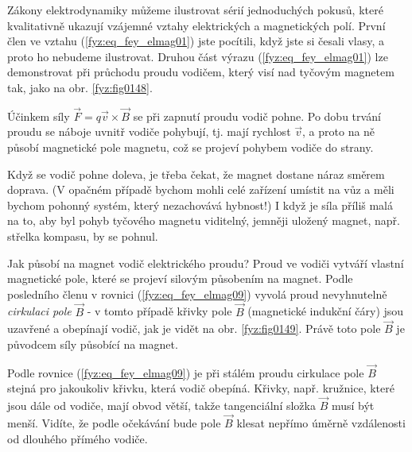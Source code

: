     Zákony elektrodynamiky můžeme ilustrovat sérií jednoduchých pokusů, které kvalitativně ukazují 
    vzájemné vztahy elektrických a magnetických polí. První člen ve vztahu 
    (\ref{fyz:eq_fey_elmag01}) jste pocítili, když jste si česali vlasy, a proto ho nebudeme 
    ilustrovat. Druhou část výrazu (\ref{fyz:eq_fey_elmag01}) lze demonstrovat při průchodu proudu 
    vodičem, který visí nad tyčovým magnetem tak, jako na obr. \ref{fyz:fig0148}.

    
    Účinkem síly \(\vec{F} = q\vec{v}\times\vec{B}\) se při zapnutí proudu vodič pohne. Po dobu 
    trvání proudu se náboje uvnitř vodiče pohybují, tj. mají rychlost \(\vec{v}\), a proto na ně 
    působí magnetické pole magnetu, což se projeví pohybem vodiče do strany.
    
    Když se vodič pohne doleva, je třeba čekat, že magnet dostane náraz směrem doprava. (V opačném 
    případě bychom mohli celé zařízení umístit na vůz a měli bychom pohonný systém, který 
    nezachovává hybnost!) I když je síla příliš malá na to, aby byl pohyb tyčového magnetu 
    viditelný, jemněji uložený magnet, např. střelka kompasu, by se pohnul.
    
    Jak působí na magnet vodič elektrického proudu? Proud ve vodiči vytváří vlastní magnetické 
    pole, které se projeví silovým působením na magnet. Podle posledního členu v rovnici 
    (\ref{fyz:eq_fey_elmag09}) vyvolá proud nevyhnutelně \emph{cirkulaci pole} \(\vec{B}\) - v 
    tomto případě křivky pole \(\vec{B}\) (magnetické indukční čáry) jsou uzavřené a obepínají 
    vodič, jak je vidět na obr. \ref{fyz:fig0149}. Právě toto pole \(\vec{B}\) je původcem 
    síly působící na magnet.  
    
    Podle rovnice (\ref{fyz:eq_fey_elmag09}) je při stálém proudu cirkulace pole \(\vec{B}\) stejná 
    pro jakoukoliv křivku, která vodič obepíná. Křivky, např. kružnice, které jsou dále od vodiče, 
    mají obvod větší, takže tangenciální složka \(\vec{B}\) musí být menší. Vidíte, že podle 
    očekávání bude pole \(\vec{B}\) klesat nepřímo úměrně vzdálenosti od dlouhého přímého 
    vodiče.     

    
